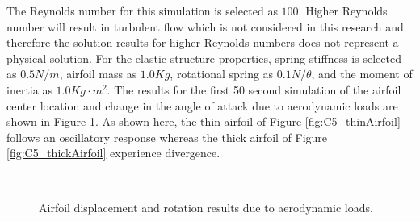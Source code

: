 %
The Reynolds number for this simulation is selected as $100$. Higher Reynolds number will result in turbulent flow which is not considered in this research and therefore the solution results for higher Reynolds numbers does not represent a physical solution. For the elastic structure properties, spring stiffness is selected as $0.5 N/m$, airfoil mass as $1.0 Kg$, rotational spring as $0.1 N/\theta$, and the moment of inertia as $1.0 Kg \cdot m^2$. The results for the first 50 second simulation of the airfoil center location and change in the angle of attack due to aerodynamic loads are shown in Figure \ref{fig:C5_airfoilDisplacementRotation}. As shown here, the thin airfoil of Figure \ref{fig:C5_thinAirfoil} follows an oscillatory response whereas the thick airfoil of Figure \ref{fig:C5_thickAirfoil} experience divergence.
%
\begin{figure}[H]
    \centering
    \quad
    \\
    \quad
    \caption{Airfoil displacement and rotation results due to aerodynamic loads.}
    \label{fig:C5_airfoilDisplacementRotation}
\end{figure}
